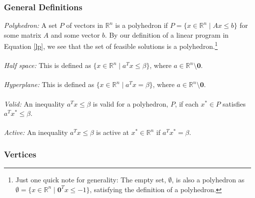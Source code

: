 \documentclass[a4paper,12pt]{scrartcl}
\theoremstyle{definition}
\theoremstyle{remark}
\begin{document}
\subsubsection{General Definitions}

{\sl Polyhedron:}
A set $P$ of vectors in $\mathbb{R}^n$ is a polyhedron
if $P=\{ x\in \mathbb{R}^n \; | \; Ax \leq b \}$ for some matrix $A$
and some vector $b$.  By our definition of a linear program in
Equation \ref{lp}, we see that the set of feasible solutions is
a polyhedron.\footnote{Just one quick note for generality: The empty
set, $\emptyset$, is also a polyhedron as $\emptyset = \{ x \in
\mathbb{R}^n \; |\; \mathbf{0}^T x \leq -1 \}$,
satisfying the definition of a polyhedron.}
\\
\\
{\sl Half space:} This is defined as $\{ x \in \mathbb{R}^n
   \; | \; a^T x \leq \beta \}$, where $a \in \mathbb{R}^n \setminus
   \mathbf{0}$.
\\\\
{\sl Hyperplane:} This is defined as $\{ x \in \mathbb{R}^n
   \; | \; a^T x = \beta \}$, where $a \in \mathbb{R}^n \setminus
   \mathbf{0}$.
\\\\
{\sl Valid:} An inequality $a^T x \leq \beta$ is valid for a
   polyhedron, $P$, if each $x^* \in P$ satisfies $a^T x^* \leq
   \beta$.
\\\\
{\sl Active:} An inequality $a^T x \leq \beta$ is active
   at $x^* \in \mathbb{R}^n$ if $a^T x^* = \beta$.


\subsubsection{Vertices}
\end{document}
